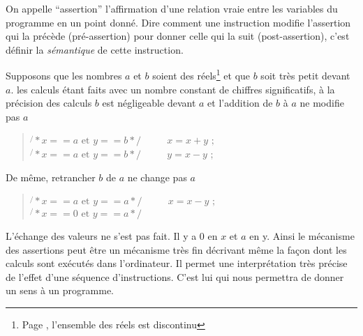 On appelle ``assertion'' l'affirmation d'une relation vraie entre les
variables du programme en un point donn\'e. Dire comment une instruction modifie
l'assertion qui la pr\'ec\`ede (pr\'e-assertion) pour donner celle qui la suit
(post-assertion), c'est d\'efinir la {\em s\'emantique} de cette instruction.

Supposons que les nombres $a$ et $b$ soient des
r\'eels\footnote{Page \pageref{Variable},
l'ensemble des r\'eels est discontinu}
et que $b$ soit tr\`es petit devant $a$. les calculs \'etant faits avec un
nombre constant de chiffres significatifs, \`a la pr\'ecision des calculs
$b$ est n\'egligeable devant $a$ et l'addition de $b$ \`a $a$ ne modifie pas $a$
\begin{quote}
$\not{ }\ast x == a \mbox{ et } y == b \ast\!\!/ $ \mbox{~~~~} $  x = x + y  \mbox{ ; } $ \\
$\not{ }\ast x == a \mbox{ et } y == b \ast\!\!/ $ \mbox{~~~~} $  y = x - y  \mbox{ ; } $
\end{quote}
De m\^eme, retrancher $b$ de $a$ ne change pas $a$
\begin{quote}
$ \not{ }\ast x == a \mbox{ et } y == a \ast\!\!/ $ \mbox{~~~~} $ x = x - y \mbox{ ; } $ \\
$ \not{ }\ast x == 0 \mbox{ et } y == a \ast\!\!/ $ 
\end {quote} 

L'\'echange des valeurs ne s'est pas fait. Il y a $0$ en $x$ et
$a$ en y. Ainsi le m\'ecanisme des assertions peut \^etre un m\'ecanisme
tr\`es fin d\'ecrivant m\^eme la fa\c con dont les calculs sont ex\'ecut\'es dans
l'ordinateur. Il permet une interpr\'etation tr\`es pr\'ecise de l'effet d'une
s\'equence d'instructions. C'est lui qui nous permettra de donner un sens
\`a un programme.
